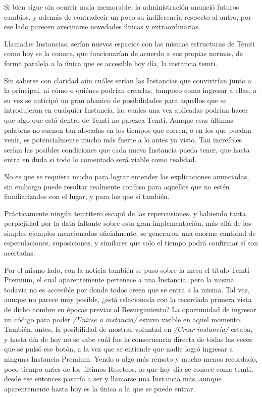 \documentclass[
]{book}
\begin{document}
Si bien sigue sin ocurrir nada memorable, la administración anunció futuros cambios, y además de contradecir un poco su indiferencia respecto al antro, por ese lado parecen avecinarse novedades únicas y extraordinarias.

Llamadas Instancias, serían nuevos espacios con las mismas estructuras de Temti como hoy se la conoce, que funcionarían de acuerdo a sus propias normas, de forma paralela a la única que es accesible hoy día, la instancia temti.

Sin saberse con claridad aún cuáles serían las Instancias que convivirían junto a la principal, ni cómo o quiénes podrían crearlas, tampoco como ingresar a ellas, a su vez se anticipó un gran abanico de posibilidades para aquellos que se introdujeran en cualquier Instancia, las cuales una vez aplicadas podrían hacer que algo que está dentro de Temti no parezca Temti. Aunque esas últimas palabras no suenen tan alocadas en los tiempos que corren, o en los que puedan venir, es potencialmente mucho más fuerte a lo antes ya visto. Tan increíbles serían las posibles condiciones que cada nueva Instancia pueda tener, que hasta entra en duda si todo lo comentado será viable como realidad.

No es que se requiera mucho para lograr entender las explicaciones anunciadas, sin embargo puede resultar realmente confuso para aquellos que no estén familiarizados con el lugar, y para los que sí también.

Prácticamente ningún temtitero escapó de las repercusiones, y habiendo tanta perplejidad por la data faltante sobre esta gran implementación, más allá de los simples ejemplos mencionados oficialmente, se generaron una enorme cantidad de especulaciones, suposiciones, y similares que solo el tiempo podrá confirmar sí son acertadas.

Por el mismo lado, con la noticia también se puso sobre la mesa el título Temti Premium, el cual aparentemente pertenece a una Instancia, pero la misma todavía no es accesible por donde todos creen que se entra a la misma. Tal vez, aunque no parece muy posible, ¿está relacionada con la recordada primera vista de dicho nombre en épocas previas al Resurgimiento? La oportunidad de ingresar un código para poder \emph{/Unirse a instancia/} estuvo visible en aquel momento. También, antes, la posibilidad de mostrar voluntad en \emph{/Crear instancia/} estaba, y hasta día de hoy no se sabe cuál fue la consecuencia directa de todas las veces que se pulsó ese botón, a la vez que se entiende que nadie logró ingresar a ninguna Instancia Premium. Yendo a algo más remoto y mucho menos recordado, poco tiempo antes de los últimos Reseteos, lo que hoy día se conoce como temti, desde ese entonces pasaría a ser y llamarse una Instancia más, aunque aparentemente hasta hoy es la única a la que se puede entrar.
\end{document}
